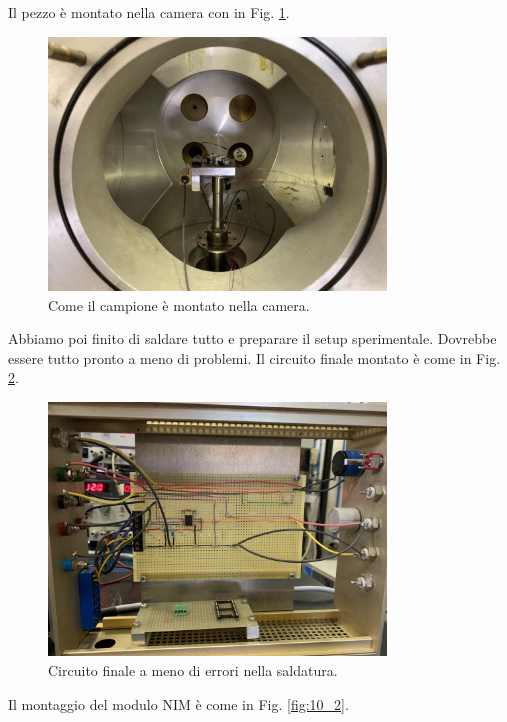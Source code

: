 \documentclass[../main/main.tex]{subfiles}
\begin{document}
Il pezzo è montato nella camera con in Fig. \ref{fig:10_3}.

\begin{figure}[h!]
\centering
\includegraphics[width=0.8\textwidth]{../lessons/image/10/3.jpg}
\caption{\label{fig:10_3} Come il campione è montato nella camera.}
\end{figure}


Abbiamo poi finito di saldare tutto e preparare il setup sperimentale. Dovrebbe essere tutto pronto a meno di problemi.
Il circuito finale montato è come in Fig. \ref{fig:10_1}.

\begin{figure}[h!]
\centering
\includegraphics[width=0.8\textwidth]{../lessons/image/10/1.jpg}
\caption{\label{fig:10_1} Circuito finale a meno di errori nella saldatura.}
\end{figure}

Il montaggio del modulo NIM è come in Fig. \ref{fig:10_2}.
\end{document}
